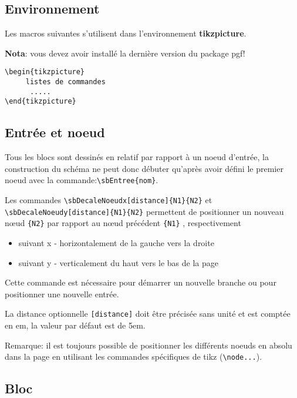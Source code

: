 \documentclass[a4paper,11pt]{article}                      %
\begin{document}
\subsection{Environnement}
\begin{minipage}[t]{0.55\linewidth}
Les macros suivantes s'utilisent dans l'environnement \textbf{tikzpicture}.

\textbf{Nota}: vous devez avoir installé la dernière version du package pgf!
\end{minipage}
\begin{minipage}[t]{0.55\linewidth}
\begin{verbatim}
\begin{tikzpicture}
     listes de commandes
      .....
\end{tikzpicture}
\end{verbatim}
\end{minipage}

\subsection{Entrée et noeud}
Tous les blocs sont dessinés en relatif par rapport à un noeud d'entrée, la construction du schéma ne peut donc débuter qu'après avoir défini le premier noeud avec la commande:\verb"\sbEntree{nom}".

Les commandes \verb"\sbDecaleNoeudx[distance]{N1}{N2}"  et \verb"\sbDecaleNoeudy[distance]{N1}{N2}"  permettent de positionner un nouveau n\oe ud \verb"{N2}" par rapport au n\oe ud précédent \verb"{N1}" , respectivement 
\begin{itemize}
\item suivant x - horizontalement de la gauche vers la droite
\item suivant y - verticalement du haut vers le bas de la page 
\end{itemize}
Cette commande est nécessaire pour démarrer un nouvelle branche ou pour positionner une nouvelle entrée.

La distance optionnelle \verb"[distance]"  doit être précisée sans unité et est comptée en em, la valeur par défaut est de 5em.

Remarque: il est toujours possible de positionner les différents noeuds en absolu dans la page en utilisant les commandes spécifiques de tikz (\verb"\node...").



\subsection{Bloc}
\end{document}
